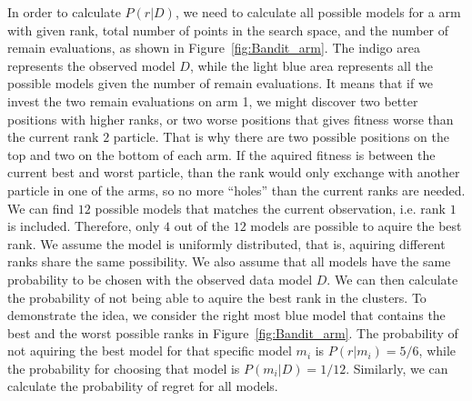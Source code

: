 In order to calculate $P(r|D)$, we need to calculate all possible models for a arm with given rank, 
total number of points in the search space, and the number of remain evaluations, 
as shown in Figure~\ref{fig:Bandit_arm}.
The indigo area represents the observed model $D$, 
while the light blue area represents all the possible models given the number of remain evaluations.
It means that if we invest the two remain evaluations on arm 1, 
we might discover two better positions with higher ranks,
or two worse positions that gives fitness worse than the current rank $2$ particle.
That is why there are two possible positions on the top and two on the bottom of each arm.
If the aquired fitness is between the current best and worst particle, 
than the rank would only exchange with another particle in one of the arms,
so no more ``holes'' than the current ranks are needed.
We can find $12$ possible models that matches the current observation, i.e. rank $1$ is included.
Therefore, only $4$ out of the $12$ models are possible to aquire the best rank.
We assume the model is uniformly distributed, that is, aquiring different ranks share the same possibility.
We also assume that all models have the same probability to be chosen with the observed data model $D$.
We can then calculate the probability of not being able to aquire the best rank in the clusters.
To demonstrate the idea, we consider the right most blue model that contains the best and the worst possible ranks in Figure~\ref{fig:Bandit_arm}.
The probability of not aquiring the best model for that specific model $m_i$ is $P(r|m_i) = 5/6$,
while the probability for choosing that model is $P(m_i|D) = 1/12$.
Similarly, we can calculate the probability of regret for all models.


